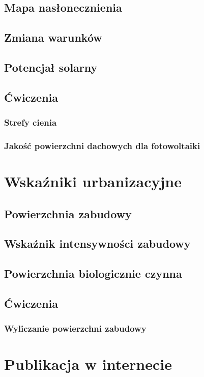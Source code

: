 \documentclass[a4paper,11pt, onecolumn, openany]{memoir}
\begin{document}
\section{Mapa nasłonecznienia}
\section{Zmiana warunków}
\section{Potencjał solarny}
\section{Ćwiczenia}
\subsection{Strefy cienia}
\subsection{Jakość powierzchni dachowych dla fotowoltaiki}

\chapter{Wskaźniki urbanizacyjne}
\section{Powierzchnia zabudowy}
\section{Wskaźnik intensywności zabudowy}
\section{Powierzchnia biologicznie czynna}
\section{Ćwiczenia}
\subsection{Wyliczanie powierzchni zabudowy}

\chapter{Publikacja w internecie}
\end{document}
